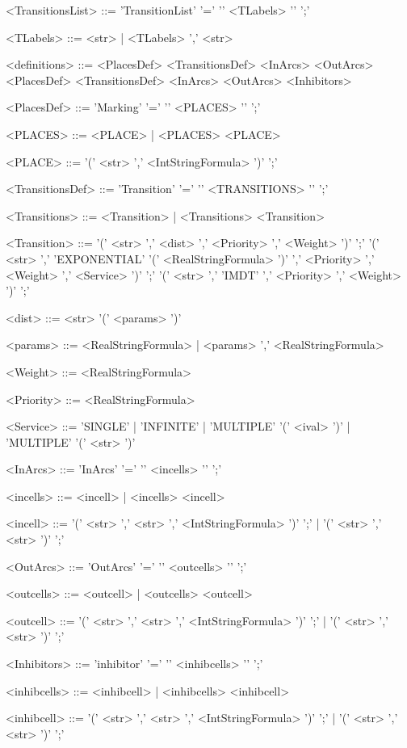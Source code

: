 \documentclass{article}
\begin{document}
\begin{scriptsize}
\begin{grammar}
<TransitionsList> ::= 'TransitionList' '=' '{' <TLabels> '}' ';'

<TLabels> ::= <str>
       | <TLabels> ',' <str>

<definitions> ::= <PlacesDef> <TransitionsDef> <InArcs> <OutArcs>
           \alt <PlacesDef> <TransitionsDef> <InArcs> <OutArcs> <Inhibitors>

<PlacesDef> ::= 'Marking' '=' '{' <PLACES> '}' ';'

<PLACES> ::= <PLACE>
      | <PLACES> <PLACE>

<PLACE> ::= '(' <str> ',' <IntStringFormula> ')' ';'

<TransitionsDef> ::= 'Transition' '=' '{' <TRANSITIONS> '}' ';'

<Transitions> ::= <Transition>
           | <Transitions> <Transition>

<Transition> ::= '(' <str> ',' <dist> ',' <Priority> ',' <Weight> ')' ';'
          \alt '(' <str> ',' 'EXPONENTIAL' '(' <RealStringFormula> ')' ',' <Priority> ',' 
            <Weight> ',' <Service> ')' ';'
          \alt '(' <str> ',' 'IMDT' ',' <Priority> ',' <Weight> ')' ';'

<dist> ::= <str> '(' <params> ')'

<params> ::= <RealStringFormula>
      | <params> ',' <RealStringFormula>

<Weight> ::= <RealStringFormula>

<Priority> ::= <RealStringFormula>

<Service> ::= 'SINGLE'
       | 'INFINITE'
       | 'MULTIPLE' '(' <ival> ')'
       | 'MULTIPLE' '(' <str> ')'

<InArcs> ::= 'InArcs' '=' '{' <incells> '}' ';'

<incells> ::= <incell>
       | <incells> <incell>

<incell> ::= '(' <str> ',' <str> ',' <IntStringFormula> ')' ';'
      | '(' <str> ',' <str> ')' ';'

<OutArcs> ::= 'OutArcs' '=' '{' <outcells> '}' ';'

<outcells> ::= <outcell>
        | <outcells> <outcell>

<outcell> ::= '(' <str> ',' <str> ',' <IntStringFormula> ')' ';'
       | '(' <str> ',' <str> ')' ';'

<Inhibitors> ::= 'inhibitor' '=' '{' <inhibcells> '}' ';'

<inhibcells> ::= <inhibcell>
          | <inhibcells> <inhibcell>

<inhibcell> ::= '(' <str> ',' <str> ',' <IntStringFormula> ')' ';'
         | '(' <str> ',' <str> ')' ';'
\end{grammar}
\end{scriptsize}
\end{document}
